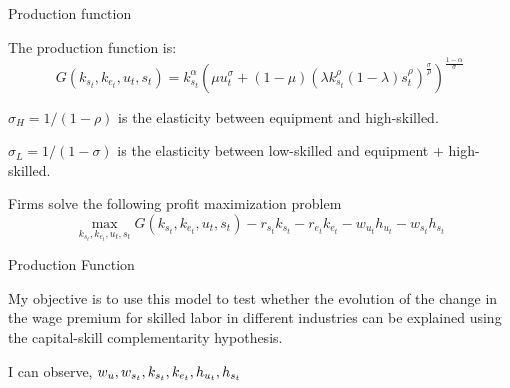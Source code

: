 \documentclass[notes,11pt, aspectratio=169]{beamer}
\newenvironment{wideitemize}{\itemize\addtolength{\itemsep}{10pt}}{\enditemize}
\begin{document}
\begin{frame}{Production function}
 \begin{wideitemize}
 \item The production function is:
 \begin{equation}\label{eq:production_fun}
 G(k_{s_t}, k_{e_t}, u_t, s_t) = k_{s_t}^\alpha\left( \mu u_t^\sigma + (1-\mu)\left(\lambda k_{s_t}^\rho (1-\lambda)s_t^\rho\right)^\frac{\sigma}{\rho}\right)^\frac{1-\alpha}{\sigma}
 \end{equation}
 \item $\sigma_{H} = 1/(1-\rho)$ is the elasticity between equipment and high-skilled.
 \item $\sigma_{L} = 1/(1-\sigma)$ is the elasticity between low-skilled and equipment + high-skilled.
 \item Firms solve the following profit maximization problem 
 \begin{equation}\label{eq:profit_max}
 \max_{k_{s_t}, k_{e_t}, u_t, s_t} G(k_{s_t}, k_{e_t}, u_t, s_t) - r_{s_t}k_{s_t} - r_{e_t}k_{e_t} - w_{u_t} h_{u_t} - w_{s_t} h_{s_t}
 \end{equation}
 \end{wideitemize}
\end{frame}

\begin{frame}{Production Function}
 \begin{wideitemize}
 \item My objective is to use this model to test whether the evolution of the change in the wage premium for skilled labor in different industries can be explained using the capital-skill complementarity hypothesis.
 
 \item I can observe, $\textcolor{black}{w_{u}}, \textcolor{black}{w_{s_t}}, k_{s_t}, \textcolor{black}{k_{e_t}}, \textcolor{black}{h_{u_t}}, \textcolor{black}{h_{s_t}}$
 
 \end{wideitemize}
\end{frame}
\end{document}

